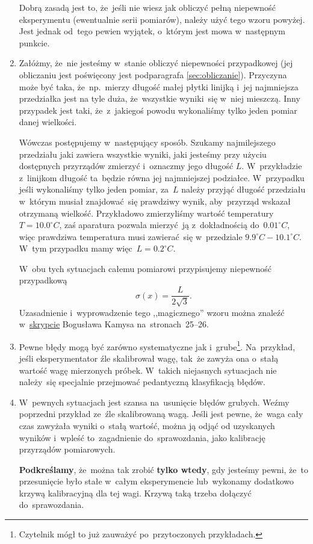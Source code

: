 \documentclass[a4paper,11pt]{article}
\begin{document}
\begin{enumerate}
  Dobrą zasadą jest to, że~jeśli nie wiesz jak obliczyć pełną
  niepewność eksperymentu (ewentualnie serii pomiarów), należy użyć
  tego wzoru powyżej. Jest jednak od~tego pewien wyjątek, o~którym
  jest mowa w~następnym punkcie.

\item Załóżmy, że~nie jesteśmy w~stanie obliczyć niepewności
  przypadkowej (jej obliczaniu jest poświęcony jest podparagrafa
  \eqref{sec:obliczanie}). Przyczyna może być taka, że~np.~mierzy
  długość małej płytki linijką i~jej najmniejsza przedziałka jest na
  tyle duża, że~wszystkie wyniki~się w~niej mieszczą. Inny przypadek
  jest taki, że~z~jakiegoś powodu wykonaliśmy tylko jeden pomiar danej
  wielkości.

  Wówczas postępujemy w~następujący sposób. Szukamy najmilejszego
  przedziału jaki zawiera wszystkie wyniki, jaki jesteśmy przy użyciu
  dostępnych przyrządów zmierzyć i~oznaczmy jego długość $L$.
  W~przykładzie z~linijkom długość ta~będzie równa jej najmniejszej
  podziałce. W~przypadku jeśli wykonaliśmy tylko jeden pomiar, za~$L$
  należy przyjąć długość przedziału w~którym musiał znajdować~się
  prawdziwy wynik, aby~przyrząd wskazał otrzymaną wielkość.
  Przykładowo zmierzyliśmy wartość temperatury
  $T = 10.0 ^{ \circ }\si{C}$, zaś aparatura pozwala mierzyć~ją
  z~dokładnością do~$0.01^{ \circ }\si{C}$, więc prawdziwa
  temperatura musi zawierać~się w~przedziale
  $9.9^{ \circ }\si{C} - 10.1 ^{ \circ }\si{C}$. W~tym przypadku mamy
  więc~$L = 0.2 ^{ \circ }\si{C}$.

  W~obu tych sytuacjach całemu pomiarowi przypisujemy niepewność
  przypadkową
  \begin{equation}
    \label{eq:2}
    \sigma( x ) = \frac{ L }{ 2 \sqrt{ 3 } }.
  \end{equation}
  Uzasadnienie i~wyprowadzenie tego ,,magicznego'' wzoru można znaleźć
  w~\href{http://users.uj.edu.pl/\~ufkamys/BK/smop1N\_h.pdf}{skrypcie}
  Bogusława Kamysa na~stronach~25--26.

\item Pewne błędy mogą być zarówno systematyczne jak
  i~grube\footnote{Czytelnik mógł to już zauważyć po~przytoczonych
    przykładach.}. Na~przykład, jeśli eksperymentator źle skalibrował
  wagę, tak~że zawyża ona o~stałą wartość wagę mierzonych próbek.
  W~takich niejasnych sytuacjach nie należy~się specjalnie przejmować
  pedantyczną klasyfikacją błędów.

\item W~pewnych sytuacjach jest szansa na~usunięcie błędów grubych.
  Weźmy poprzedni przykład ze~źle skalibrowaną wagą. Jeśli jest pewne,
  że~waga cały czas zawyżała wyniki o~stałą wartość, można ją odjąć od
  uzyskanych wyników i~wpleść to~zagadnienie do~sprawozdania, jako
  kalibrację przyrządów pomiarowych.

  \textbf{Podkreślamy}, że~można tak zrobić \textbf{tylko wtedy}, gdy
  jesteśmy pewni, że~to przesunięcie było stałe w~całym eksperymencie
  lub~wykonamy dodatkowo krzywą kalibracyjną dla tej wagi. Krzywą taką
  trzeba dołączyć do~sprawozdania.
\end{enumerate}
\end{document}

